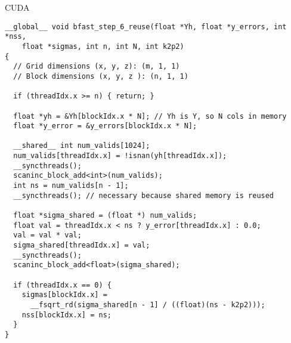 \begin{frame}[fragile]{CUDA}

\begin{verbatim}
__global__ void bfast_step_6_reuse(float *Yh, float *y_errors, int *nss,
    float *sigmas, int n, int N, int k2p2)
{
  // Grid dimensions (x, y, z): (m, 1, 1)
  // Block dimensions (x, y, z ): (n, 1, 1)

  if (threadIdx.x >= n) { return; }

  float *yh = &Yh[blockIdx.x * N]; // Yh is Y, so N cols in memory
  float *y_error = &y_errors[blockIdx.x * N];

  __shared__ int num_valids[1024];
  num_valids[threadIdx.x] = !isnan(yh[threadIdx.x]);
  __syncthreads();
  scaninc_block_add<int>(num_valids);
  int ns = num_valids[n - 1];
  __syncthreads(); // necessary because shared memory is reused

  float *sigma_shared = (float *) num_valids;
  float val = threadIdx.x < ns ? y_error[threadIdx.x] : 0.0;
  val = val * val;
  sigma_shared[threadIdx.x] = val;
  __syncthreads();
  scaninc_block_add<float>(sigma_shared);

  if (threadIdx.x == 0) {
    sigmas[blockIdx.x] =
      __fsqrt_rd(sigma_shared[n - 1] / ((float)(ns - k2p2)));
    nss[blockIdx.x] = ns;
  }
}
\end{verbatim}

  \end{frame}

